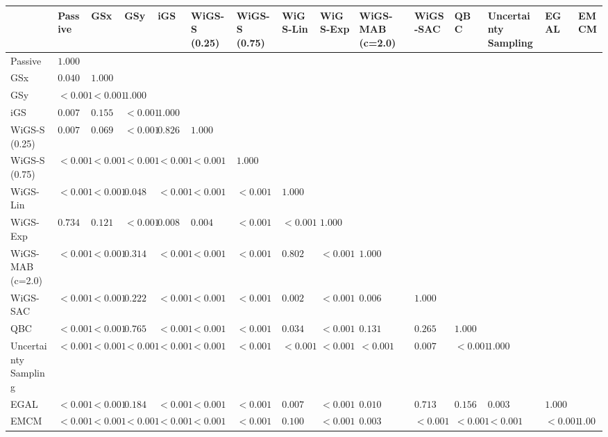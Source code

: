 \begin{tabular}{lllllllllllllll}
\toprule
 & Passive & GSx & GSy & iGS & WiGS-S (0.25) & WiGS-S (0.75) & WiGS-Lin & WiGS-Exp & WiGS-MAB (c=2.0) & WiGS-SAC & QBC & Uncertainty Sampling & EGAL & EMCM \\
\midrule
Passive & $1.000$ &  &  &  &  &  &  &  &  &  &  &  &  &  \\
GSx & $0.040$ & $1.000$ &  &  &  &  &  &  &  &  &  &  &  &  \\
GSy & $<0.001$ & $<0.001$ & $1.000$ &  &  &  &  &  &  &  &  &  &  &  \\
iGS & $0.007$ & $0.155$ & $<0.001$ & $1.000$ &  &  &  &  &  &  &  &  &  &  \\
WiGS-S (0.25) & $0.007$ & $0.069$ & $<0.001$ & $0.826$ & $1.000$ &  &  &  &  &  &  &  &  &  \\
WiGS-S (0.75) & $<0.001$ & $<0.001$ & $<0.001$ & $<0.001$ & $<0.001$ & $1.000$ &  &  &  &  &  &  &  &  \\
WiGS-Lin & $<0.001$ & $<0.001$ & $0.048$ & $<0.001$ & $<0.001$ & $<0.001$ & $1.000$ &  &  &  &  &  &  &  \\
WiGS-Exp & $0.734$ & $0.121$ & $<0.001$ & $0.008$ & $0.004$ & $<0.001$ & $<0.001$ & $1.000$ &  &  &  &  &  &  \\
WiGS-MAB (c=2.0) & $<0.001$ & $<0.001$ & $0.314$ & $<0.001$ & $<0.001$ & $<0.001$ & $0.802$ & $<0.001$ & $1.000$ &  &  &  &  &  \\
WiGS-SAC & $<0.001$ & $<0.001$ & $0.222$ & $<0.001$ & $<0.001$ & $<0.001$ & $0.002$ & $<0.001$ & $0.006$ & $1.000$ &  &  &  &  \\
QBC & $<0.001$ & $<0.001$ & $0.765$ & $<0.001$ & $<0.001$ & $<0.001$ & $0.034$ & $<0.001$ & $0.131$ & $0.265$ & $1.000$ &  &  &  \\
Uncertainty Sampling & $<0.001$ & $<0.001$ & $<0.001$ & $<0.001$ & $<0.001$ & $<0.001$ & $<0.001$ & $<0.001$ & $<0.001$ & $0.007$ & $<0.001$ & $1.000$ &  &  \\
EGAL & $<0.001$ & $<0.001$ & $0.184$ & $<0.001$ & $<0.001$ & $<0.001$ & $0.007$ & $<0.001$ & $0.010$ & $0.713$ & $0.156$ & $0.003$ & $1.000$ &  \\
EMCM & $<0.001$ & $<0.001$ & $<0.001$ & $<0.001$ & $<0.001$ & $<0.001$ & $0.100$ & $<0.001$ & $0.003$ & $<0.001$ & $<0.001$ & $<0.001$ & $<0.001$ & $1.000$ \\
\bottomrule
\end{tabular}
